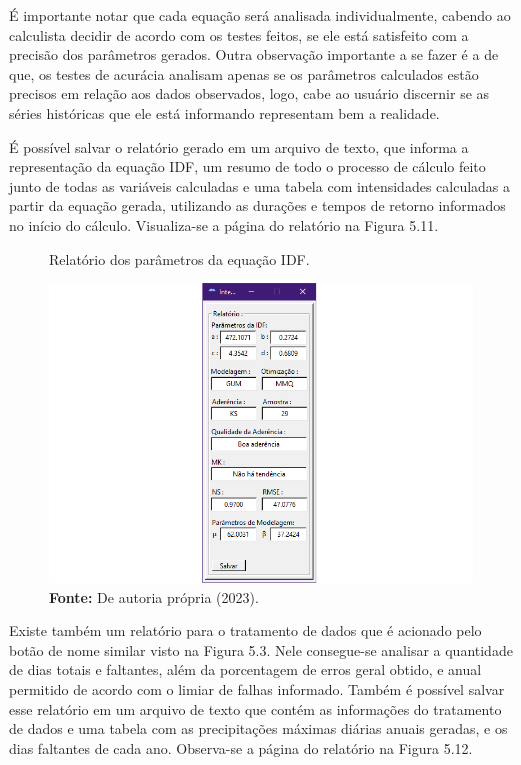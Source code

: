 É importante notar que cada equação será analisada individualmente, cabendo ao calculista decidir de acordo com os testes feitos, se ele está satisfeito com a precisão dos parâmetros gerados. Outra observação importante a se fazer é a de que, os testes de acurácia analisam apenas se os parâmetros calculados estão precisos em relação aos dados observados, logo, cabe ao usuário discernir se as séries históricas que ele está informando representam bem a realidade.

É possível salvar o relatório gerado em um arquivo de texto, que informa a representação da equação IDF, um resumo de todo o processo de cálculo feito junto de todas as variáveis calculadas e uma tabela com intensidades calculadas a partir da equação gerada, utilizando as durações e tempos de retorno informados no início do cálculo. Visualiza-se a página do relatório na Figura 5.11.\bigskip

\begin{figure}[!ht]
	\centering
	\caption{Relatório dos parâmetros da equação IDF.}
	\includegraphics[width=.7625\linewidth]{figuras/relatorio_de_equacoes.png}
	\caption*{\textbf{Fonte:} De autoria própria (2023).}
	\label{fig:figuras/relatorio_de_equacoes.png}
\end{figure}

\newpage

Existe também um relatório para o tratamento de dados que é acionado pelo botão de nome similar visto na Figura 5.3. Nele consegue-se analisar a quantidade de dias totais e faltantes, além da porcentagem de erros geral obtido, e anual permitido de acordo com o limiar de falhas informado. Também é possível salvar esse relatório em um arquivo de texto que contém as informações do tratamento de dados e uma tabela com as precipitações máximas diárias anuais geradas, e os dias faltantes de cada ano. Observa-se a página do relatório na Figura 5.12.\bigskip

